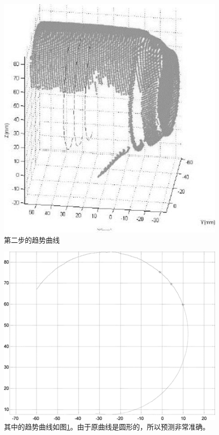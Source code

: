 \documentclass[AutoFakeBold,zihao=-4]{ctexart}
\begin{document}
	\begin{figure}[h]
		\centering
		\includegraphics[scale=0.9]{PIC13}
		\caption{第二步的趋势曲线}
		\label{fig-13}
	\end{figure}

	\begin{figure}[H]
		\centering
		\includegraphics[scale=0.9]{PIC14}
		\caption{ 其中的趋势曲线如图\ref{fig-13}。由于原曲线是圆形的，所以预测非常准确。}
		\label{fig-14}
	\end{figure}
\end{document}

